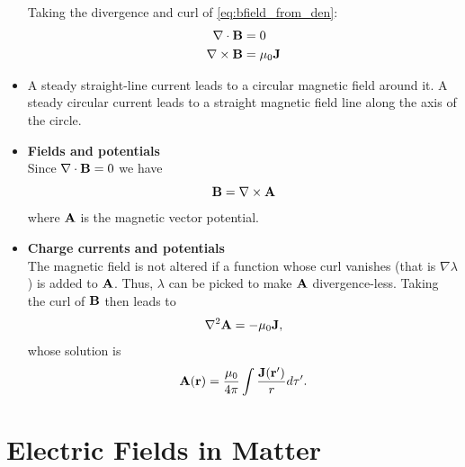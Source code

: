 \documentclass[a4paper,11pt]{report}
\begin{document}
\begin{itemize}
Taking the divergence and curl of \cref{eq:bfield_from_den}:
\begin{align}
\nabla \cdot \mathbf{B} &= 0 \\
\nabla \times \mathbf{B} &= \mu_0 \mathbf{J} \label{eq:amperes_law}
\end{align}


\item A steady straight-line current leads to a circular magnetic field around it. A steady circular current leads to a straight magnetic field line along the axis of the circle.

\item \textbf{Fields and potentials} \\
Since $\nabla \cdot \mathbf{B} = 0$  we have 
\begin{equation} \mathbf{B} = \nabla \times \mathbf{A} \end{equation}
where $\mathbf{A}$ is the magnetic vector potential. 

\item \textbf{Charge currents and potentials} \\
The magnetic field is not altered if a function whose curl vanishes (that is $\nabla \lambda$ ) is added to $\mathbf{A}$. Thus, $\lambda$ can be picked to make $\mathbf{A}$ divergence-less. Taking the curl of $\mathbf{B}$ then leads to 
\begin{equation}
\nabla^2 \mathbf{A} = -\mu_0 \mathbf{J}, 
\end{equation}
whose solution is
\begin{equation}
    \mathbf{A}(\mathbf{r}) = \frac{\mu_0}{4 \pi } \int \frac{ \mathbf{J}(\mathbf{r}')}{r} d\tau'.
\end{equation}

\end{itemize}

\section{Electric Fields in Matter}
\end{document}
